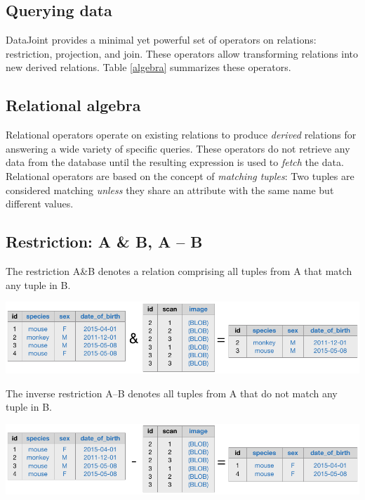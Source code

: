 \documentclass[10pt,letterpaper]{article}
\begin{document}
\subsection*{Querying data}
DataJoint provides a minimal yet powerful set of operators on relations: restriction, projection, and join.
These operators allow transforming relations into new derived relations. 
Table \ref{algebra} summarizes these operators.
\begin{table}
\begin{boxedminipage}{\textwidth}
\section*{Relational algebra}

Relational operators operate on existing relations to produce \emph{derived} relations for answering a wide variety of specific queries.
These operators do not retrieve any data from the database until the resulting expression is used to \emph{fetch} the data.
Relational operators are based on the concept of \emph{matching tuples}: 
Two tuples are considered matching  \emph{unless} they share an attribute with the same name but different values.

\subsection*{Restriction:  {\sf A \& B}, {\sf A -- B}}
The restriction A\&B denotes a relation comprising all tuples from A that match any tuple in {\sf B}.  

\begin{center}
\includegraphics{./figures/restriction.pdf}
\end{center}

The inverse restriction {\sf A--B} denotes all tuples from {\sf A} that do not match any tuple in {\sf B}.

\begin{center}
\includegraphics{./figures/antijoin.pdf}
\end{center}



\end{boxedminipage}
\end{table}
\end{document}
